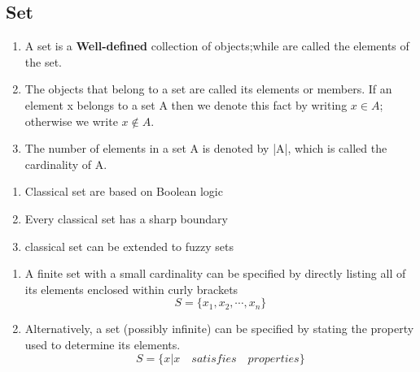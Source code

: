 \documentclass[cn,10pt,math=newtx,citestyle=gb7714-2015,bibstyle=gb7714-2015]{elegantbook}
\begin{document}
\subsection{Set}
\begin{definition}[Set]

\begin{enumerate}
	\item A set is a \textbf{Well-defined} collection of objects;while are called the elements
of the set.
    \item The objects that belong to a set are called its elements or members. If an element x belongs to a set A then we denote this fact by writing $x\in A$; otherwise we write $x\notin A$.
    \item The number of elements in a set A is denoted by |A|, which is called the cardinality of A.

\end{enumerate}

    
\end{definition}
\begin{note}
    \begin{enumerate}
        \item Classical set are based on Boolean logic
        \item Every classical set has a sharp boundary
        \item classical set can be extended to fuzzy sets
    \end{enumerate}
    \begin{property}[Representations]
        \begin{enumerate}
            \item A finite set with a small cardinality can be specified by directly listing all of its elements enclosed within curly brackets \begin{equation}
                S=\{x_1,x_2,\cdots,x_n\}
            \end{equation}
            \item Alternatively, a set (possibly infinite) can be specified by stating the property used to determine its elements.\begin{equation}
                S=\{x|x\quad satisfies\quad properties\}
			\end{equation}
		\end{enumerate}
	\end{property}
\end{note}
\end{document}
